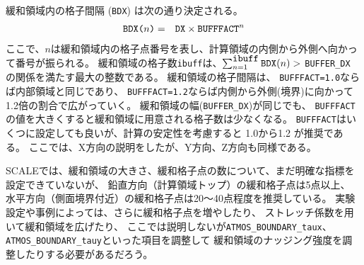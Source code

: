 緩和領域内の格子間隔 (\verb|BDX|) は次の通り決定される。
\begin{eqnarray}
 \verb|BDX(|n\verb|)| &=& \verb|DX| \times \verb|BUFFFACT|^n \nonumber
\end{eqnarray}
ここで、$n$は緩和領域内の格子点番号を表し、計算領域の内側から外側へ向かって番号が振られる。
緩和領域の格子数\verb|ibuff|は、$\sum_{n=1}^{\verb|ibuff|} \verb|BDX|(n) >$ \verb|BUFFER_DX| の関係を満たす最大の整数である。
%
緩和領域の格子間隔は、
\verb|BUFFFACT=1.0|ならば内部領域と同じであり、
\verb|BUFFFACT=1.2|ならば内側から外側(境界)に向かって1.2倍の割合で広がっていく。
緩和領域の幅(\verb|BUFFER_DX|)が同じでも、
\verb|BUFFFACT|の値を大きくすると緩和領域に用意される格子数は少なくなる。
\verb|BUFFFACT|はいくつに設定しても良いが、計算の安定性を考慮すると 1.0から1.2 が推奨である。
ここでは、X方向の説明をしたが、Y方向、Z方向も同様である。


SCALEでは、緩和領域の大きさ、緩和格子点の数について、まだ明確な指標を設定できていないが、
鉛直方向（計算領域トップ）の緩和格子点は5点以上、
水平方向（側面境界付近）の緩和格子点は20〜40点程度を推奨している。
実験設定や事例によっては、さらに緩和格子点を増やしたり、
ストレッチ係数を用いて緩和領域を広げたり、
ここでは説明しないが\verb|ATMOS_BOUNDARY_taux|、\verb|ATMOS_BOUNDARY_tauy|といった項目を調整して
緩和領域のナッジング強度を調整したりする必要があるだろう。

